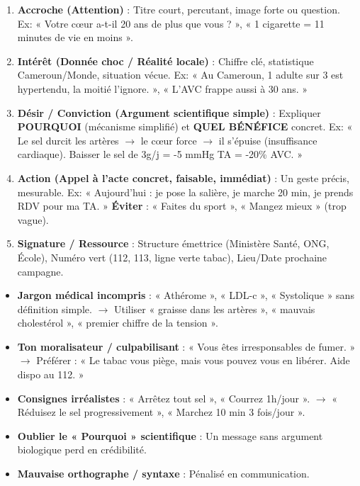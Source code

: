 \documentclass[11pt]{article}
\begin{document}
\begin{methode}
\begin{enumerate}
    \item \textbf{Accroche (Attention)} : Titre court, percutant, image forte ou question. Ex: « Votre cœur a-t-il 20 ans de plus que vous ? », « 1 cigarette = 11 minutes de vie en moins ».
    \item \textbf{Intérêt (Donnée choc / Réalité locale)} : Chiffre clé, statistique Cameroun/Monde, situation vécue. Ex: « Au Cameroun, 1 adulte sur 3 est hypertendu, la moitié l'ignore. », « L'AVC frappe aussi à 30 ans. »
    \item \textbf{Désir / Conviction (Argument scientifique simple)} : Expliquer \textbf{POURQUOI} (mécanisme simplifié) et \textbf{QUEL BÉNÉFICE} concret. Ex: « Le sel durcit les artères $\rightarrow$ le cœur force $\rightarrow$ il s'épuise (insuffisance cardiaque). Baisser le sel de 3g/j = -5 mmHg TA = -20\% AVC. »
    \item \textbf{Action (Appel à l'acte concret, faisable, immédiat)} : Un geste précis, mesurable. Ex: « Aujourd'hui : je pose la salière, je marche 20 min, je prends RDV pour ma TA. » \textbf{Éviter} : « Faites du sport », « Mangez mieux » (trop vague).
    \item \textbf{Signature / Ressource} : Structure émettrice (Ministère Santé, ONG, École), Numéro vert (112, 113, ligne verte tabac), Lieu/Date prochaine campagne.
\end{enumerate}
\end{methode}

\begin{attention}
\begin{itemize}
    \item \textbf{Jargon médical incompris} : « Athérome », « LDL-c », « Systolique » sans définition simple. $\rightarrow$ Utiliser « graisse dans les artères », « mauvais cholestérol », « premier chiffre de la tension ».
    \item \textbf{Ton moralisateur / culpabilisant} : « Vous êtes irresponsables de fumer. » $\rightarrow$ Préférer : « Le tabac vous piège, mais vous pouvez vous en libérer. Aide dispo au 112. »
    \item \textbf{Consignes irréalistes} : « Arrêtez tout sel », « Courrez 1h/jour ». $\rightarrow$ « Réduisez le sel progressivement », « Marchez 10 min 3 fois/jour ».
    \item \textbf{Oublier le « Pourquoi » scientifique} : Un message sans argument biologique perd en crédibilité.
    \item \textbf{Mauvaise orthographe / syntaxe} : Pénalisé en communication.
\end{itemize}
\end{attention}
\end{document}
